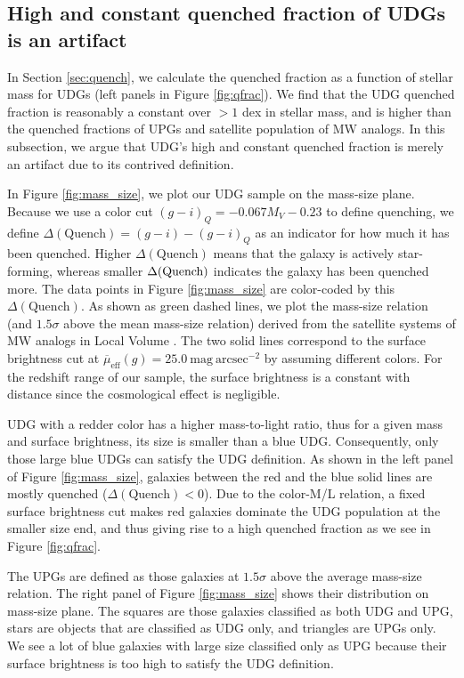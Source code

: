 \documentclass[twocolumn,astrosymb,twocolappendix]{aastex631}
\newcommand{\sbunit}{\mathrm{mag\ arcsec}^{-2}}
\newcommand{\sbeff}{\overline{\mu}_{\mathrm{eff}}(g)}
\begin{document}
\begin{CJK*}{UTF8}{gbsn}
\subsection{High and constant quenched fraction of UDGs is an artifact}


In Section \ref{sec:quench}, we calculate the quenched fraction as a function of stellar mass for UDGs (left panels in Figure \ref{fig:qfrac}). We find that the UDG quenched fraction is reasonably a constant over $>1$ dex in stellar mass, and is higher than the quenched fractions of UPGs and satellite population of MW analogs. In this subsection, we argue that UDG's high and constant quenched fraction is merely an artifact due to its contrived definition. 

In Figure \ref{fig:mass_size}, we plot our UDG sample on the mass-size plane. Because we use a color cut $(g-i)_{Q} = -0.067 M_V - 0.23$ to define quenching, we define $\Delta(\mathrm{Quench}) = (g-i) - (g-i)_{Q}$ as an indicator for how much it has been quenched. Higher $\Delta(\mathrm{Quench})$ means that the galaxy is actively star-forming, whereas smaller $\Delta(\rm Quench)$ indicates the galaxy has been quenched more. The data points in Figure \ref{fig:mass_size} are color-coded by this $\Delta(\mathrm{Quench})$. As shown as green dashed lines, we plot the mass-size relation (and $1.5\sigma$ above the mean mass-size relation) derived from the satellite systems of MW analogs in Local Volume \citep{ELVES-I}. The two solid lines correspond to the surface brightness cut at $\sbeff = 25.0\ \sbunit$ by assuming different colors. For the redshift range of our sample, the surface brightness is a constant with distance since the cosmological effect is negligible. 

UDG with a redder color has a higher mass-to-light ratio, thus for a given mass and surface brightness, its size is smaller than a blue UDG. Consequently, only those large blue UDGs can satisfy the UDG definition. As shown in the left panel of Figure \ref{fig:mass_size}, galaxies between the red and the blue solid lines are mostly quenched ($\Delta(\mathrm{Quench}) < 0$). Due to the color-M/L relation, a fixed surface brightness cut makes red galaxies dominate the UDG population at the smaller size end, and thus giving rise to a high quenched fraction as we see in Figure \ref{fig:qfrac}. 

The UPGs are defined as those galaxies at $1.5\sigma$ above the average mass-size relation. The right panel of Figure \ref{fig:mass_size} shows their distribution on mass-size plane. The squares are those galaxies classified as both UDG and UPG, stars are objects that are classified as UDG only, and triangles are UPGs only. We see a lot of blue galaxies with large size classified only as UPG because their surface brightness is too high to satisfy the UDG definition. 


\end{CJK*}
\end{document}
